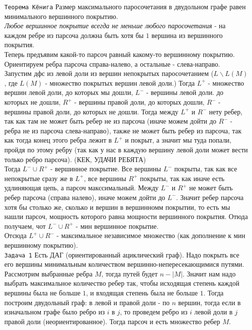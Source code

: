 \documentclass{article}
\newcommand{\ti}[1]{\textit{#1}}
\newcommand{\abs}[1]{\left|{#1}\right|}
\begin{document}
\verb'Теорема Кёнига' Размер максимального паросочетания в двудольном графе равен минимального вершинного покрытию. \\
\ti{Любое вершинное покрытие всегда не меньше любого паросочетания} - на каждом ребре из парсоча должна быть хотя бы $1$ вершина из вершинного покрытия. \\
Теперь предъявим какой-то парсоч равный какому-то вершинному покрытию. Ориентируем ребра парсоча справа-налево, а остальные - слева-направо. Запустим дфс из левой доли из вершин непокрытых паросочетанием ($L \backslash L(M)$, где $L(M)$ - множество покрытых вершин левой доли.) Тогда $L^{+}$ - множество вершин левой доли, до которых мы дошли, $L^{-}$ - вершины левой доли. до которых не дошли, $R^{+}$ - вершины правой доли, до которых дошли, $R^{-}$ - вершины правой доли, до которых не дошли. Тогда между $L^{+}$ и $R^{-}$ нету ребер, так как там не может быть ребер не из парсоча (иначе можем дойти до $R^{-}$ - ребра не из парсоча слева-направо), также не может быть ребер из парсоча, так как тогда конец этого ребра лежит в $L^{+}$ и покрыт, а значит мы туда попали, пройдя по этому ребру (так как у нас в каждую вершину левой доли может вести только ребро парсоча). (КЕК, УДАЧИ РЕБЯТА) \\
Тогда $L^- \cup R^+$ - вершинное покрытие. Все вершины $L^-$ покрыты, так как все непокрытые сразу же в $L^+$, все вершины $R^+$ покрыты, так как иначе есть удлиняющая цепь, а парсоч макссимальный. Между $L^-$ и $R^+$ не может быть ребер парсоча (справа налево), иначе можем дойти до $L^-$. Значит ребер парсоча  хотя бы столько же, сколько и вершин в вершинномм покрытии, то есть мы нашли парсоч, мощность которого равна мощности вершинного покрытия. Отюда получаем, чот $L^- \cup R^+$ - мин вершинное покрытие. \\
Отсюда $L^+ \cup R^-$ - максимальное независимое множество (как дополнение к мин вершинному покрытию). \\  

\verb'Задача 1'
Есть ДАГ (ориентированный ациклический граф). Надо покрыть все его вершины минимальным количеством вершинно-непересекающимися путями. \\ 
Рассмотрим выбранные ребра $M$, тогда путей будет $n - \abs{M}$. Значит нам надо выбрать максимальное количество ребер так, чтобы исходящая степень каждой вершины была не больше $1$, и входящая степень была не больше $1$. Тогда построим двудольный граф: в левой и правой доли - по $n$ вершин, тогда если в изначальном графе было ребро из $i$ в $j$, то проведем ребро из $i$ левой доли в $j$ правой доли (неориентированное). Тогда парсоч и есть множество ребер $M$. \\
\end{document}
